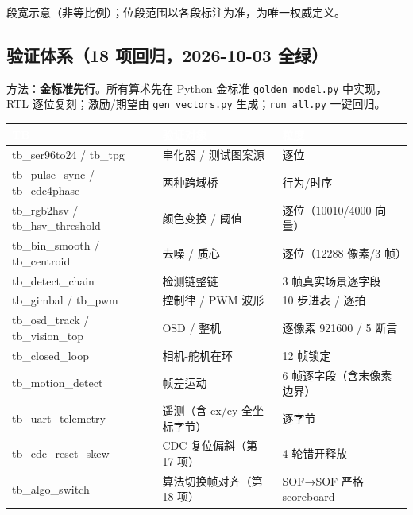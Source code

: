 \documentclass[10pt]{ctexart}
\newcommand{\code}[1]{\texttt{#1}}
\begin{document}
\begin{center}

{\tiny\color{black!55} 段宽示意（非等比例）；位段范围以各段标注为准，为唯一权威定义。}
\end{center}

\subsection{验证体系（18 项回归，2026-10-03 全绿）}

方法：\textbf{金标准先行}。所有算术先在 Python 金标准 \code{golden\_model.py} 中实现，
RTL 逐位复刻；激励/期望由 \code{gen\_vectors.py} 生成；\code{run\_all.py} 一键回归。

\begin{center}
\renewcommand{\arraystretch}{1.35}
{\small
\begin{tabular}{@{}>{\ttfamily}p{5.2cm}p{4.9cm}p{4.6cm}@{}}
\toprule
\rowcolor{deep}
\textcolor{white}{\textbf{TB}} & \textcolor{white}{\textbf{验证对象}} & \textcolor{white}{\textbf{粒度}} \\
\midrule
tb\_ser96to24 / tb\_tpg & 串化器 / 测试图案源 & 逐位 \\
tb\_pulse\_sync / tb\_cdc4phase & 两种跨域桥 & 行为/时序 \\
tb\_rgb2hsv / tb\_hsv\_threshold & 颜色变换 / 阈值 & 逐位（10010/4000 向量）\\
tb\_bin\_smooth / tb\_centroid & 去噪 / 质心 & 逐位（12288 像素/3 帧）\\
tb\_detect\_chain & 检测链整链 & 3 帧真实场景逐字段 \\
tb\_gimbal / tb\_pwm & 控制律 / PWM 波形 & 10 步进表 / 逐拍 \\
tb\_osd\_track / tb\_vision\_top & OSD / 整机 & 逐像素 921600 / 5 断言 \\
tb\_closed\_loop & 相机-舵机在环 & 12 帧锁定 \\
tb\_motion\_detect & 帧差运动 & 6 帧逐字段（含末像素边界）\\
tb\_uart\_telemetry & 遥测（含 cx/cy 全坐标字节） & 逐字节 \\
tb\_cdc\_reset\_skew & CDC 复位偏斜（第 17 项） & 4 轮错开释放 \\
tb\_algo\_switch & 算法切换帧对齐（第 18 项） & SOF→SOF 严格 scoreboard \\
\bottomrule
\end{tabular}}
\end{center}
\end{document}
